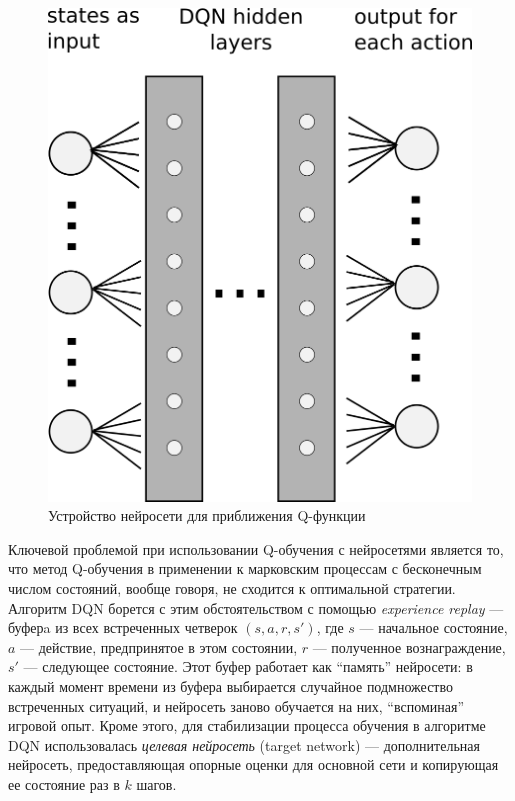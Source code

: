 \documentclass[specification,annotation,times]{itmo-student-thesis}
\theoremstyle{definition}
\begin{document}
\begin{figure}[!h]
  \caption{Устройство нейросети для приближения Q-функции}\label{dqn-scheme}
  \centering
  \includegraphics{dqn-scheme}
\end{figure}

Ключевой проблемой при использовании Q-обучения с нейросетями является то, что
метод Q-обучения в применении к марковским процессам с бесконечным числом
состояний, вообще говоря, не сходится к оптимальной стратегии. Алгоритм DQN
борется с этим обстоятельством с помощью \textit{experience replay} --- буферa
из всех встреченных четверок $(s, a, r, s')$, где $s$ ---
начальное состояние, $a$ --- действие, предпринятое в этом состоянии, $r$ ---
полученное вознаграждение, $s'$ --- следующее состояние. Этот буфер работает как
\enquote{память} нейросети: в каждый момент времени из буфера выбирается случайное
подмножество встреченных ситуаций, и нейросеть заново обучается на них,
\enquote{вспоминая} игровой опыт. Кроме этого, для стабилизации процесса обучения в
алгоритме DQN использовалась \textit{целевая нейросеть} (target network) ---
дополнительная нейросеть, предоставляющая опорные оценки для основной сети и
копирующая ее состояние раз в $k$ шагов.
\end{document}
